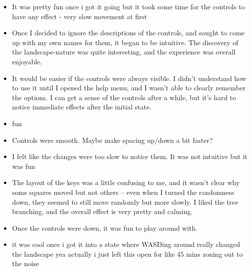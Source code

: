 \begin{itemize}
    \item It was pretty fun once i got it going but it took some time for the controls to
        have any effect - very slow movement at first

    \item Once I decided to ignore the descriptions of the controls, and sought to come up
        with my own names for them, it began to be intuitive. The discovery of the
        landscape-nature was quite interesting, and the experience was overall
        enjoyable.

    \item It would be easier if the controls were always visible. I didn't understand how
        to use it until I opened the help menu, and I wasn't able to clearly remember
        the options. I can get a sense of the controls after a while, but it's hard to
        notice immediate effects after the initial state.

    \item fun

    \item Controls were smooth. Maybe make spacing up/down a bit faster? 

    \item I felt like the changes were too slow to notice them. It was not intuitive but
        it was fun

    \item The layout of the keys was a little confusing to me, and it wasn't clear why
        some squares moved but not others -- even when I turned the randomness down,
        they seemed to still move randomly but more slowly. I liked the tree branching,
        and the overall effect is very pretty and calming.

    \item Once the controls were down, it was fun to play around with.

    \item it was cool once i got it into a state where WASDing around really changed the
        landscape yea actually i just left this open for like 45 mins zoning out to the noise
\end{itemize}

